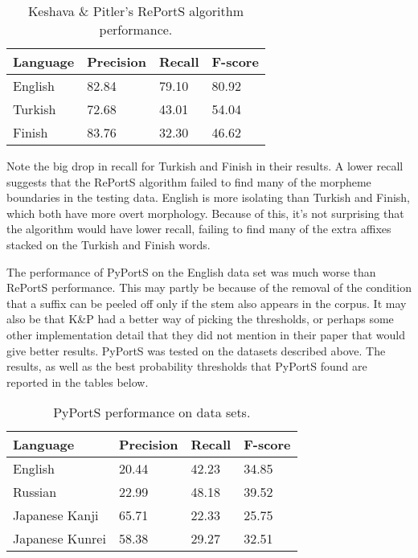 \documentclass[paper=a4, fontsize=11pt]{article}
\begin{document}
\begin{table}[!htbp]
\centering
\label{my-label}
\begin{tabular}{|l|lll|}
\hline
Language & \multicolumn{1}{l|}{Precision} & \multicolumn{1}{l|}{Recall} & F-score \\ \hline
English  & 82.84                          & 79.10                       & 80.92   \\ \cline{1-1}
Turkish  & 72.68                          & 43.01                       & 54.04   \\ \cline{1-1}
Finish   & 83.76                          & 32.30                       & 46.62   \\ \hline
\end{tabular}
\caption{Keshava \& Pitler's RePortS algorithm performance.}
\end{table}

Note the big drop in recall for Turkish and Finish in their results. A lower recall suggests that the RePortS algorithm failed to find many of the morpheme boundaries in the testing data. English is more isolating than Turkish and Finish, which both have more overt morphology. Because of this, it's not surprising that the algorithm would have lower recall, failing to find many of the extra affixes stacked on the Turkish and Finish words.

\clearpage
The performance of PyPortS on the English data set was much worse than RePortS performance. This may partly be because of the removal of the condition that a suffix can be peeled off only if the stem also appears in the corpus. It may also be that K\&P had a better way of picking the thresholds, or perhaps some other implementation detail that they did not mention in their paper that would give better results. PyPortS was tested on the datasets described above. The results, as well as the best probability thresholds that PyPortS found are reported in the tables below.

\begin{table}[!htbp]
\centering
\label{my-label}
\begin{tabular}{|l|lll|}
\hline
Language             & \multicolumn{1}{l|}{Precision} & \multicolumn{1}{l|}{Recall} & F-score \\ \hline
English              & 20.44                          & 42.23                       & 34.85   \\ \cline{1-1}
Russian              & 22.99                          & 48.18                       & 39.52   \\ \cline{1-1}
Japanese Kanji       & 65.71                          & 22.33                       & 25.75   \\ \cline{1-1}
Japanese Kunrei      & 58.38                          & 29.27                       & 32.51   \\ \hline
\end{tabular}
\caption{PyPortS performance on data sets.} 
\end{table}
\end{document}
